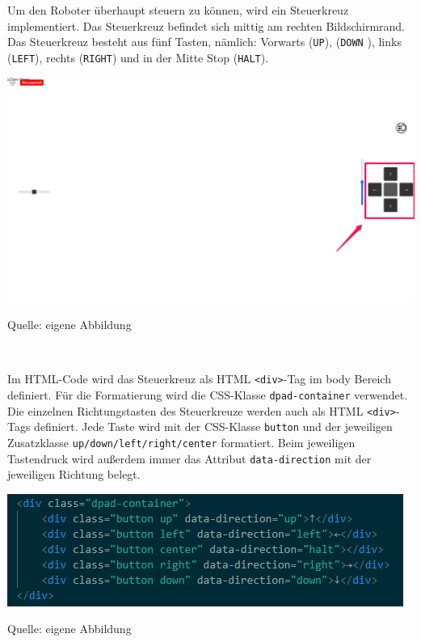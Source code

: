 \documentclass[ngerman,12pt,a4paper]{article}
\begin{document}
	Um den Roboter überhaupt steuern zu können, wird ein Steuerkreuz implementiert. Das Steuerkreuz befindet sich mittig am rechten Bildschirmrand. Das Steuerkreuz besteht aus fünf Tasten, nämlich: Vorwarts (\texttt{UP}), (\texttt{DOWN} ), links (\texttt{LEFT}), rechts (\texttt{RIGHT}) und in der Mitte Stop (\texttt{HALT}). \\[0.5cm]
	\begin{center}
		\begin{minipage}[t]{1\textwidth}
			\includegraphics{Pictures/Steuerung-web}
			\label{fig:Steuerkreuz-web}
			\vspace{-10pt}
			\begin{center}
				\par\small Quelle: eigene Abbildung 
			\end{center}
		\end{minipage} \\[0.75cm]
	\end{center}
	Im HTML-Code wird das Steuerkreuz als HTML \texttt{<div>}-Tag im body Bereich definiert. Für die Formatierung wird die CSS-Klasse \texttt{dpad-container} verwendet. Die einzelnen Richtungstasten des Steuerkreuze werden auch als HTML \texttt{<div>}-Tags definiert. Jede Taste wird mit der CSS-Klasse \texttt{button} und der jeweiligen Zusatzklasse \texttt{up/down/left/right/center} formatiert. Beim jeweiligen Tastendruck wird außerdem immer das Attribut \texttt{data-direction} mit der jeweiligen Richtung belegt.\\
	\begin{center}
		\begin{minipage}[t]{0.85\textwidth}
			\includegraphics{Pictures/Steuerung-html}
			\label{fig:Steuerkreuz-html}
			\vspace{-10pt}
			\begin{center}
				\par\small Quelle: eigene Abbildung 
			\end{center}
		\end{minipage} \\[0.75cm]
	\end{center}
\end{document}
